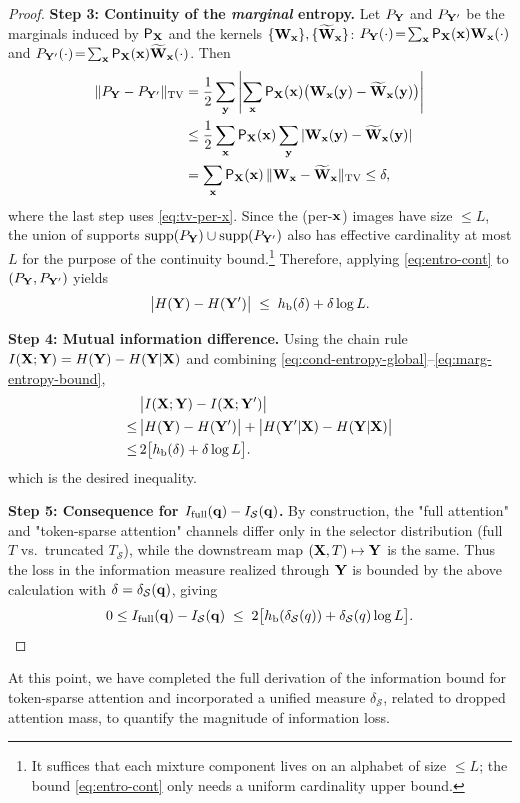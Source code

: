 \begin{proof}
\textbf{Step 3: Continuity of the \emph{marginal} entropy.}
Let $P_{\mathbf{Y}}$ and $P_{\mathbf{Y}'}$ be the marginals induced by $\mathsf P_{\mathbf{X}}$ and the
kernels $\{\mathbf{W}_{\mathbf{x}}\},\{\widetilde {\mathbf{W}}_{\mathbf{x}}\}$:
$P_{\mathbf{Y}}(\cdot)\!=\!\sum_{\mathbf{x}} \mathsf P_{\mathbf{X}}(\mathbf{x}) \mathbf{W}_{\mathbf{x}}(\cdot)$ and
$P_{\mathbf{Y}'}(\cdot)\!=\!\sum_{\mathbf{x}} \mathsf P_{\mathbf{X}}(\mathbf{x}) \widetilde {\mathbf{W}}_{\mathbf{x}}(\cdot)$.
Then
\begin{align*}
\|P_{\mathbf{Y}}-P_{\mathbf{Y}'}\|_{\mathrm{TV}}
&=\frac12\sum_{\mathbf{y}}\left| \sum_{\mathbf{x}} \mathsf P_{\mathbf{X}}(\mathbf{x})\big(\mathbf{W}_{\mathbf{x}}(\mathbf{y})-\widetilde {\mathbf{W}}_{\mathbf{x}}(\mathbf{y})\big)\right|
\\
&\le \frac12 \sum_{\mathbf{x}} \mathsf P_{\mathbf{X}}(\mathbf{x})\sum_{\mathbf{y}} |\mathbf{W}_{\mathbf{x}}(\mathbf{y})-\widetilde {\mathbf{W}}_{\mathbf{x}}(\mathbf{y})| \\
&= \sum_{\mathbf{x}} \mathsf P_{\mathbf{X}}(\mathbf{x})\,\|\mathbf{W}_{\mathbf{x}}-\widetilde {\mathbf{W}}_{\mathbf{x}}\|_{\mathrm{TV}}\le \delta,
\end{align*}
where the last step uses \eqref{eq:tv-per-x}. Since the (per-$\mathbf{x}$) images have
size $\le L$, the union of supports $\mathrm{supp}(P_{\mathbf{Y}})\cup\mathrm{supp}(P_{\mathbf{Y}'})$ also has effective cardinality at most $L$ for the purpose of the continuity bound.\footnote{It
suffices that each mixture component lives on an alphabet of size $\le L$; the
bound \eqref{eq:entro-cont} only needs a uniform cardinality upper bound.}
Therefore, applying \eqref{eq:entro-cont} to $(P_{\mathbf{Y}},P_{\mathbf{Y}'})$ yields
\begin{equation}
\label{eq:marg-entropy-bound}
\big| H(\mathbf{Y})-H(\mathbf{Y}')\big|
\;\le\;
h_{\mathrm b}(\delta)+\delta\log L .
\end{equation}

\textbf{Step 4: Mutual information difference.}
Using the chain rule $I(\mathbf{X};\mathbf{Y})=H(\mathbf{Y})-H(\mathbf{Y}|\mathbf{X})$ and combining
\eqref{eq:cond-entropy-global}–\eqref{eq:marg-entropy-bound},
\begin{align}
    &\big|I(\mathbf{X};\mathbf{Y})-I(\mathbf{X};\mathbf{Y}')\big| \nonumber \\
    \le \, 
    &\big|H(\mathbf{Y})-H(\mathbf{Y}')\big|+\big|H(\mathbf{Y}'|\mathbf{X})-H(\mathbf{Y}|\mathbf{X})\big| \nonumber \\
    \le \,
    &2\big[h_{\mathrm b}(\delta)+\delta\log L\big].
\end{align}
which is the desired inequality.

\textbf{Step 5: Consequence for $I_{\mathrm{full}}(\mathbf{q})-I_{\mathcal S}(\mathbf{q})$.}
By construction, the "full attention" and "token-sparse attention" channels differ only in the selector distribution (full $T$ vs.\ truncated $T_{\mathcal S}$), while the
downstream map $(\mathbf{X},T)\mapsto \mathbf{Y}$ is the same. Thus the loss in the information
measure realized through $\mathbf{Y}$ is bounded by the above calculation with
$\delta=\delta_{\mathcal S}(\mathbf{q})$, giving
\[
0\le I_{\mathrm{full}}(\mathbf{q})-I_{\mathcal S}(\mathbf{q})
\;\le\;
2\big[h_{\mathrm b}(\delta_{\mathcal S}(q))+\delta_{\mathcal S}(q)\log L\big].
\]
\end{proof}
At this point, we have completed the full derivation of the information bound for token-sparse attention and incorporated a unified measure $\delta_{\mathcal S}$, related to dropped attention mass, to quantify the magnitude of information loss.

